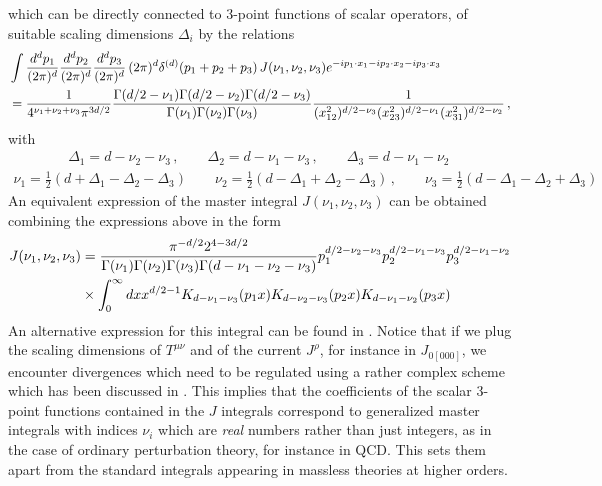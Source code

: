 \documentclass[a4paper,11pt,openright,twoside]{book}
\numberwithin{equation}{section}
\begin{document}
{{\begin{equation}
\end{equation}
which can be directly connected to 3-point functions of scalar operators, of suitable scaling dimensions $\Delta_i$ by the relations 
\begin{align}
	& \int \frac{d^d p_1}{(2\pi)^d} \frac{d^d p_2}{(2\pi)^d} \frac{d^d p_3}{(2\pi)^d} \, (2\pi)^d \delta^{(d)}(p_1 + p_2 + p_3) \, 
	J(\nu_1,\nu_2,\nu_3) e^{- i p_1 \cdot x_1 - i p_2 \cdot x_2 - i p_3 \cdot x_3} \notag\\ 
	& = \frac{1}{4^{\nu_1+\nu_2+\nu_3} \pi^{3 d/2}}  \frac{\Gamma(d/2 - \nu_1) \Gamma(d/2 - \nu_2) \Gamma(d/2 - \nu_3)}{\Gamma(\nu_1) 
		\Gamma(\nu_2) \Gamma(\nu_3)}  \frac{1}{(x_{12}^2)^{d/2- \nu_3} (x_{23}^2)^{d/2- \nu_1} (x_{31}^2)^{d/2- \nu_2}}\,, \notag\\ 
	\label{oner}
\end{align}
with 
\begin{align}
	\label{etafromnu}
	\Delta_1 = d - \nu_2 - \nu_3 \,, \qquad
	\Delta_2 = d - \nu_1 - \nu_3 \,, \qquad
	\Delta_3 = d - \nu_1 - \nu_2 \, 
\end{align}
\begin{align}
	\label{etafromnu}
	\nu_1= \frac{1}{2} (d + \Delta_1 -\Delta_2-\Delta_3) \qquad
	\nu_2 = \frac{1}{2}(d - \Delta_1 + \Delta_2 -\Delta_3)\,, \qquad
	\nu_3 = \frac{1}{2}(d - \Delta_1 - \Delta_2 +\Delta_3)\,
\end{align}
An equivalent expression of the master integral $J(\nu_1,\nu_2,\nu_3)$ can be obtained combining the expressions above in the form
\begin{eqnarray}
	J(\nu_1,\nu_2,\nu_3)
	&=\frac{\pi^{-d/2} 2^{4 - 3 d/2} }{\Gamma(\nu_1)\Gamma(\nu_2)\Gamma(\nu_3)\Gamma(d-\nu_1-\nu_2-\nu_3)} p_1^{d/2-\nu_2-\nu_3} p_2^{d/2-\nu_1-\nu_3}p_3^{d/2-\nu_1-\nu_2}\notag\\
	& \times \int_0^\infty d x x^{d/2-1}K_{d-\nu_1-\nu_3} (p_1 x) K_{d-\nu_2-\nu_3} (p_2 x) K_{d-\nu_1-\nu_2} (p_3 x) 
\end{eqnarray}
An alternative expression for this integral can be found in \cite{Coriano:2013jba}. 
Notice that if we plug the scaling dimensions of $T^{\mu\nu}$ and of the current $J^\rho$, for instance in $J_{0[000]}$, we encounter divergences which need to be regulated using a rather complex scheme which has been discussed in \cite{Bzowski:2013sza}. This implies that the coefficients of the scalar 3-point functions contained in the $J$ integrals 
correspond to generalized master integrals with indices $\nu_i$ which are {\em real} numbers rather than just integers, as in the case of ordinary perturbation theory, for instance in QCD. This sets them apart from the standard integrals appearing in massless theories at higher orders. \\ 
}}
\end{document}
